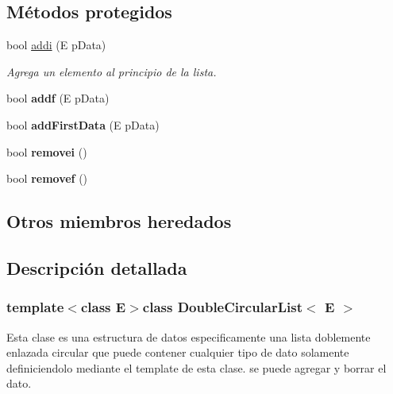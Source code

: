 \subsection*{Métodos protegidos}
\begin{DoxyCompactItemize}
\item 
bool \hyperlink{classDoubleCircularList_aee387acc4f53773302be4aa98bc779dc}{addi} (E p\-Data)
\begin{DoxyCompactList}\small\item\em Agrega un elemento al principio de la lista. \end{DoxyCompactList}\item 
\hypertarget{classDoubleCircularList_a4a6ec7a7298470389b88b0c775a9bace}{bool {\bfseries addf} (E p\-Data)}\label{classDoubleCircularList_a4a6ec7a7298470389b88b0c775a9bace}

\item 
\hypertarget{classDoubleCircularList_aff5a0088509cc88dccfe31389d48f19e}{bool {\bfseries add\-First\-Data} (E p\-Data)}\label{classDoubleCircularList_aff5a0088509cc88dccfe31389d48f19e}

\item 
\hypertarget{classDoubleCircularList_a1d2c6f1fec95c8d2887c54cb3fc3ff84}{bool {\bfseries removei} ()}\label{classDoubleCircularList_a1d2c6f1fec95c8d2887c54cb3fc3ff84}

\item 
\hypertarget{classDoubleCircularList_a937da114318f91c6013dd4543636da9d}{bool {\bfseries removef} ()}\label{classDoubleCircularList_a937da114318f91c6013dd4543636da9d}

\end{DoxyCompactItemize}
\subsection*{Otros miembros heredados}


\subsection{Descripción detallada}
\subsubsection*{template$<$class E$>$class Double\-Circular\-List$<$ E $>$}

Esta clase es una estructura de datos especificamente una lista doblemente enlazada circular que puede contener cualquier tipo de dato solamente definiciendolo mediante el template de esta clase. se puede agregar y borrar el dato. 

